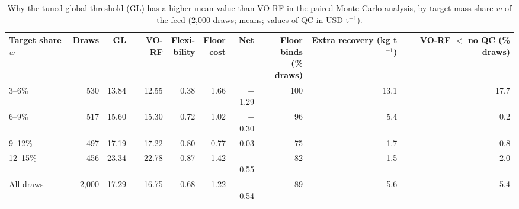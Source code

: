 \begin{table}[!htbp]\centering
\begingroup\linespread{1}\selectfont\footnotesize\setlength{\tabcolsep}{3pt}
\caption{Why the tuned global threshold (GL) has a higher mean value than VO-RF in the paired Monte Carlo analysis, by target mass share $w$ of the feed (2,000 draws; means; values of QC in USD t$^{-1}$).}\label{tab:gapdecomp}
\begin{tabular*}{\textwidth}{@{\extracolsep{\fill}}lrrrrrrrrr@{}}\toprule
\shortstack[l]{Target\\share $w$} & Draws & GL & VO-RF & \shortstack{Flexi-\\bility} & \shortstack{Floor\\cost} & Net & \shortstack{Floor\\binds\\(\% draws)} & \shortstack{Extra\\recovery\\(kg t$^{-1}$)} & \shortstack{VO-RF $<$\\no QC\\(\% draws)}\\\midrule
3--6\% & 530 & 13.84 & 12.55 & 0.38 & 1.66 & $-$1.29 & 100 & 13.1 & 17.7\\
6--9\% & 517 & 15.60 & 15.30 & 0.72 & 1.02 & $-$0.30 & 96 & 5.4 & 0.2\\
9--12\% & 497 & 17.19 & 17.22 & 0.80 & 0.77 & 0.03 & 75 & 1.7 & 0.8\\
12--15\% & 456 & 23.34 & 22.78 & 0.87 & 1.42 & $-$0.55 & 82 & 1.5 & 2.0\\
\midrule All draws & 2,000 & 17.29 & 16.75 & 0.68 & 1.22 & $-$0.54 & 89 & 5.6 & 5.4\\
\bottomrule\end{tabular*}
\par{}
\endgroup
\end{table}
